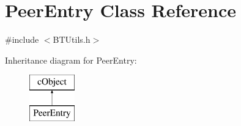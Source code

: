 \hypertarget{classPeerEntry}{}\section{Peer\+Entry Class Reference}
\label{classPeerEntry}


{\ttfamily \#include $<$B\+T\+Utils.\+h$>$}

Inheritance diagram for Peer\+Entry\+:\begin{figure}[H]
\begin{center}
\leavevmode
\includegraphics[height=2.000000cm]{classPeerEntry}
\end{center}
\end{figure}

